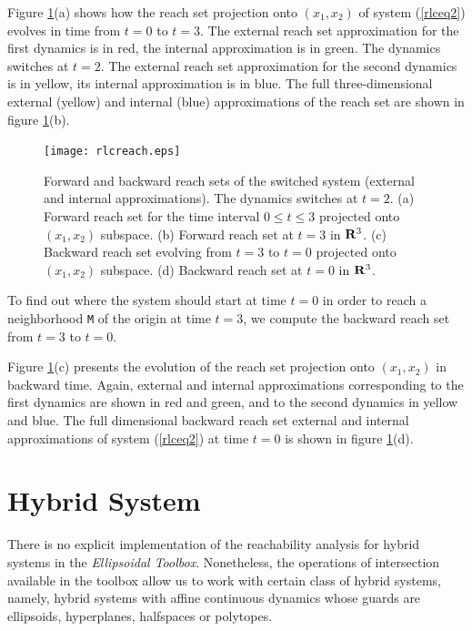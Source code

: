 
Figure \ref{rlcreachfig}(a) shows how the reach set projection
onto $(x_1, x_2)$ of system (\ref{rlceq2})
evolves in time from $t=0$  to $t=3$. The external reach set approximation
for the first dynamics is in red, the internal approximation is in green.
The dynamics switches at $t=2$.
The external reach set approximation for the second dynamics is in yellow,
its internal approximation is in blue.
The full three-dimensional external (yellow) and internal (blue)
approximations of the reach set are shown in figure \ref{rlcreachfig}(b).
\begin{figure}[htbp]
\centerline{
\texttt{[image: rlcreach.eps]}}
\caption{Forward and backward reach sets of the switched system
(external and internal approximations).
The dynamics switches at $t=2$.
\newline
(a) Forward reach set for the time interval $0\leq t\leq3$ projected onto
$(x_1,x_2)$ subspace.
\newline
(b) Forward reach set at $t=3$ in ${\bf R}^3$.
\newline
(c) Backward reach set evolving from $t=3$ to $t=0$ projected onto
$(x_1,x_2)$ subspace.
\newline
(d) Backward reach set at $t=0$ in ${\bf R}^3$.}
\label{rlcreachfig}
\end{figure}

To find out where the system should start at time $t=0$ in order to reach
a neighborhood {\tt M} of the origin at time $t=3$,
we compute the backward reach set from $t=3$ to $t=0$.

Figure \ref{rlcreachfig}(c) presents the evolution of the reach set
projection onto $(x_1, x_2)$ in backward time.
Again, external and internal approximations corresponding
to the first dynamics are shown in red and green, and
to the second dynamics in yellow and blue. The
full dimensional backward reach set external and internal
approximations of system (\ref{rlceq2})
at time $t=0$ is shown in figure \ref{rlcreachfig}(d).



\section{Hybrid System}
There is no explicit implementation of the reachability analysis for hybrid
systems in the {\it Ellipsoidal Toolbox}.
Nonetheless, the operations of intersection available in the toolbox allow us
to work with certain class of hybrid systems, namely,
hybrid systems with affine continuous dynamics whose guards are
ellipsoids, hyperplanes, halfspaces or polytopes.

